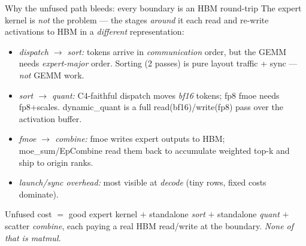 \documentclass[pdf,aspectratio=169]{beamer}
\newcommand{\empy}[1]{{\color{darkorange}\emph{#1}}}
\newcommand{\empr}[1]{{\color{cardinalred}\emph{#1}}}
\newcommand{\examplebox}[2]{%
\begin{tcolorbox}[colframe=darkcardinal,colback=boxgray,title={#1}]
#2
\end{tcolorbox}}
\newcommand{\mc}[1]{{\ttfamily\small #1}}
\begin{document}
\begin{frame}{Why the unfused path bleeds: every boundary is an HBM round-trip}
\footnotesize
The expert kernel is \emph{not} the problem --- the stages \emph{around} it each read and re-write activations to HBM in a \emph{different} representation:
\begin{itemize}\footnotesize
  \item \empr{dispatch $\to$ sort:} tokens arrive in \emph{communication} order, but the GEMM needs \emph{expert-major} order. Sorting (2 passes) is pure layout traffic + sync --- \emph{not} GEMM work.
  \item \empr{sort $\to$ quant:} C4-faithful dispatch moves \emph{bf16} tokens; fp8 fmoe needs fp8+scales. \mc{dynamic\_quant} is a full read(bf16)/write(fp8) pass over the activation buffer.
  \item \empr{fmoe $\to$ combine:} fmoe writes expert outputs to HBM; \mc{moe\_sum}/\mc{EpCombine} read them back to accumulate weighted top-k and ship to origin ranks.
  \item \empr{launch/sync overhead:} most visible at \emph{decode} (tiny rows, fixed costs dominate).
\end{itemize}
\examplebox{Takeaway for the slide}{\footnotesize Unfused cost $=$ good expert kernel $+$ standalone \emph{sort} $+$ standalone \emph{quant} $+$ scatter \emph{combine}, each paying a real HBM read/write at the boundary. \empy{None of that is matmul.}}
\end{frame}
\end{document}
